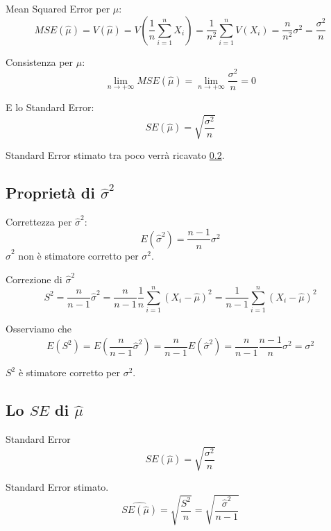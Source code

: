 \documentclass[
  11pt,
]{book}
\theoremstyle{mytheoremstyle}
\theoremstyle{mydefstyle}
\begin{document}
\begin{info}
Mean Squared Error per \(\mu\):
\[
  MSE(\hat\mu) = V(\hat\mu)
                   = V\left(\frac 1 n \sum_{i=1}^n X_i\right)
                 = \frac 1 {n^2} \sum_{i=1}^n V(X_i)
                 = \frac n {n^2} \sigma^2
                 = \frac {\sigma^2}n
\]

\end{info}

\begin{info}
Consistenza per \(\mu\):
\[
  \lim_{n\to+\infty} MSE(\hat\mu) = \lim_{n\to+\infty} \frac {\sigma^2}n = 0
\]

E lo Standard Error:
\[SE(\hat\mu)=\sqrt{\frac {\sigma^2}n}\]

\end{info}

Standard Error stimato tra poco verrà ricavato \ref{ssem}.

\subsection{\texorpdfstring{Proprietà di \(\hat\sigma^2\)}{Proprietà di \textbackslash hat\textbackslash sigma\^{}2}}\label{vnorm}

\begin{info}
Correttezza per \(\hat\sigma^2\):
\[
  E(\hat\sigma^2) =  \frac {n-1}{n}\sigma^2
\]
\(\hat\sigma^2\) non è stimatore corretto per \(\sigma^2\).

\end{info}

\begin{info}
Correzione di \(\hat\sigma^2\)
\[
  S^2=\frac{n}{n-1}\hat\sigma^2=\frac{n}{n-1}\frac{1}n\sum_{i=1}^n(X_i-\hat\mu)^2=\frac{1}{n-1}\sum_{i=1}^n(X_i-\hat\mu)^2
\]

\end{info}

Osserviamo che
\[
  E(S^2)=E\left(\frac{n}{n-1}\hat\sigma^2\right)=\frac{n}{n-1}E\left(\hat\sigma^2\right)= \frac{n}{n-1}\frac {n-1}{n}\sigma^2=\sigma^2
\]

\(S^2\) è stimatore corretto per \(\sigma^2\).

\subsection{\texorpdfstring{Lo \(SE\) di \(\hat\mu\)}{Lo SE di \textbackslash hat\textbackslash mu}}\label{ssem}

\begin{info}
Standard Error
\[SE(\hat\mu)=\sqrt{\frac {\sigma^2}n}\]

Standard Error stimato.
\[\widehat{SE(\hat\mu)}=\sqrt{\frac {S^2}n}=\sqrt{\frac {\hat\sigma^2}{n-1}}\]

\end{info}
\end{document}
